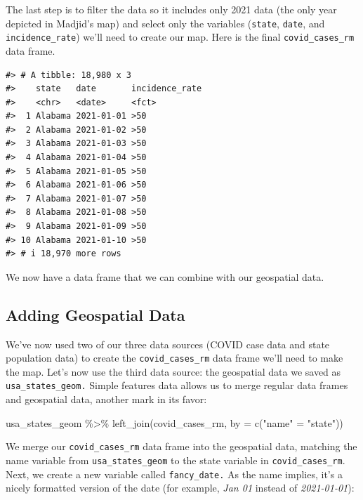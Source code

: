 \documentclass[
]{book}
\newenvironment{Shaded}{\begin{snugshade}}{\end{snugshade}}
\newcommand{\AttributeTok}[1]{\textcolor[rgb]{0.77,0.63,0.00}{#1}}
\newcommand{\FunctionTok}[1]{\textcolor[rgb]{0.00,0.00,0.00}{#1}}
\newcommand{\NormalTok}[1]{#1}
\newcommand{\OtherTok}[1]{\textcolor[rgb]{0.56,0.35,0.01}{#1}}
\newcommand{\SpecialCharTok}[1]{\textcolor[rgb]{0.00,0.00,0.00}{#1}}
\newcommand{\StringTok}[1]{\textcolor[rgb]{0.31,0.60,0.02}{#1}}
\begin{document}
The last step is to filter the data so it includes only 2021 data (the only year depicted in Madjid's map) and select only the variables (\texttt{state}, \texttt{date}, and \texttt{incidence\_rate}) we'll need to create our map. Here is the final \texttt{covid\_cases\_rm} data frame.

\begin{verbatim}
#> # A tibble: 18,980 x 3
#>    state   date       incidence_rate
#>    <chr>   <date>     <fct>         
#>  1 Alabama 2021-01-01 >50           
#>  2 Alabama 2021-01-02 >50           
#>  3 Alabama 2021-01-03 >50           
#>  4 Alabama 2021-01-04 >50           
#>  5 Alabama 2021-01-05 >50           
#>  6 Alabama 2021-01-06 >50           
#>  7 Alabama 2021-01-07 >50           
#>  8 Alabama 2021-01-08 >50           
#>  9 Alabama 2021-01-09 >50           
#> 10 Alabama 2021-01-10 >50           
#> # i 18,970 more rows
\end{verbatim}

We now have a data frame that we can combine with our geospatial data.

\hypertarget{adding-geospatial-data}{%
\subsection*{Adding Geospatial Data}\label{adding-geospatial-data}}

We've now used two of our three data sources (COVID case data and state population data) to create the \texttt{covid\_cases\_rm} data frame we'll need to make the map. Let's now use the third data source: the geospatial data we saved as \texttt{usa\_states\_geom.} Simple features data allows us to merge regular data frames and geospatial data, another mark in its favor:

\begin{Shaded}
\begin{Highlighting}[]
\NormalTok{usa\_states\_geom }\SpecialCharTok{\%\textgreater{}\%}
  \FunctionTok{left\_join}\NormalTok{(covid\_cases\_rm, }\AttributeTok{by =} \FunctionTok{c}\NormalTok{(}\StringTok{"name"} \OtherTok{=} \StringTok{"state"}\NormalTok{))}
\end{Highlighting}
\end{Shaded}

We merge our \texttt{covid\_cases\_rm} data frame into the geospatial data, matching the name variable from \texttt{usa\_states\_geom} to the state variable in \texttt{covid\_cases\_rm}. Next, we create a new variable called \texttt{fancy\_date.} As the name implies, it's a nicely formatted version of the date (for example, \emph{Jan 01} instead of \emph{2021-01-01}):
\end{document}
